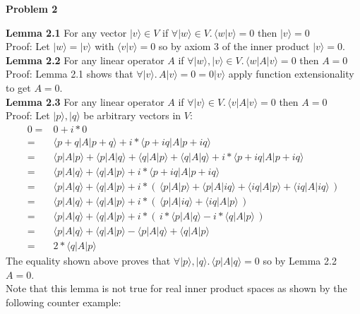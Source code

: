 \documentclass[fleqn]{article}
\newcommand{\problem}[1]{{\large\textbf{Problem #1}}}
\newcommand{\lemma}[2]{\textbf{Lemma #1} #2}
\newcommand{\bra}[1]{\ensuremath{\langle #1 |}}
\newcommand{\ket}[1]{\ensuremath{| #1 \rangle}}
\newcommand{\innerF}[2]{\ensuremath{\langle #1 | #2 \rangle}}
\begin{document}
\problem{2}

\lemma{2.1}{For any vector $\ket{v} \in V$ if
  $\forall \ket{w} \in V. \, \innerF{w}{v} = 0$ then $\ket{v} = 0$
} \\
Proof: Let $\ket{w} = \ket{v}$ with $\innerF{v}{v} = 0$ so by axiom 3 of the
inner product $\ket{v} = 0$. \\

\lemma{2.2}{For any linear operator $A$ if
  $\forall \ket{w}, \ket{v} \in V. \, \bra{w}A\ket{v} = 0$
  then $A = 0$
} \\
Proof: Lemma 2.1 shows that $\forall \ket{v}. \, A\ket{v} = 0 = 0\ket{v}$ apply
function extensionality to get $A = 0$. \\

\lemma{2.3}{For any linear operator $A$ if
  $\forall \ket{v} \in V. \, \bra{v}A\ket{v} = 0$
  then $A = 0$
} \\
Proof: Let $\ket{p}, \ket{q}$ be arbitrary vectors in $V$:
\vspace{-0.5em}
\begin{align*}
  0 =& 0 + i * 0 \\
    =& \bra{p + q}A\ket{p + q} + i * \bra{p + iq}A\ket{p + iq} \\
    =& \bra{p}A\ket{p} + \bra{p}A\ket{q} + \bra{q}A\ket{p} + \bra{q}A\ket{q} + i * \bra{p + iq}A\ket{p + iq} \\
    =& \bra{p}A\ket{q} + \bra{q}A\ket{p} + i * \bra{p + iq}A\ket{p + iq} \\
    =& \bra{p}A\ket{q} + \bra{q}A\ket{p} +
       i * \left( \, \bra{p}A\ket{p} + \bra{p}A\ket{iq} + \bra{iq}A\ket{p} + \bra{iq}A\ket{iq} \, \right) \\
    =& \bra{p}A\ket{q} + \bra{q}A\ket{p} + i * \left( \, \bra{p}A\ket{iq} + \bra{iq}A\ket{p} \, \right) \\
    =& \bra{p}A\ket{q} + \bra{q}A\ket{p} + i * \left( \, i * \bra{p}A\ket{q} - i * \bra{q}A\ket{p} \, \right) \\
    =& \bra{p}A\ket{q} + \bra{q}A\ket{p} - \bra{p}A\ket{q} + \bra{q}A\ket{p} \\
    =& 2 * \bra{q}A\ket{p}
\end{align*}
The equality shown above proves that
$\forall \ket{p}, \ket{q}. \, \bra{p}A\ket{q} = 0$
so by Lemma 2.2 $A = 0$. \\
Note that this lemma is not true for real inner product
spaces as shown by the following counter example:
\end{document}
